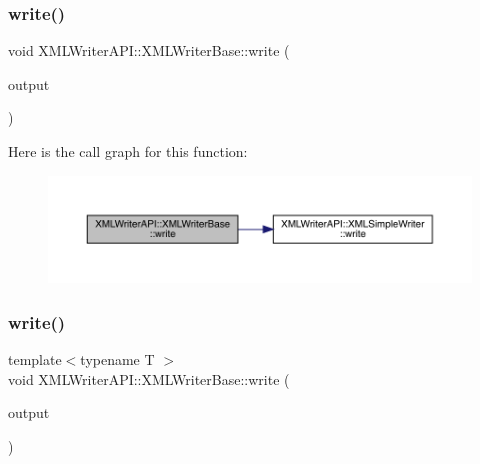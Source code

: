 \subsubsection{\texorpdfstring{write()}{write()}\hspace{0.1cm}{\footnotesize\ttfamily [20/26]}}
{\footnotesize\ttfamily void X\+M\+L\+Writer\+A\+P\+I\+::\+X\+M\+L\+Writer\+Base\+::write (\begin{DoxyParamCaption}\item[{const bool \&}]{output }\end{DoxyParamCaption})\hspace{0.3cm}{\ttfamily [inline]}}

Here is the call graph for this function\+:
\nopagebreak
\begin{figure}[H]
\begin{center}
\leavevmode
\includegraphics[width=350pt]{d5/df5/classXMLWriterAPI_1_1XMLWriterBase_ac9c7d2ed0127b4dd05b4b3c0225d9f34_cgraph}
\end{center}
\end{figure}
\mbox{\label{classXMLWriterAPI_1_1XMLWriterBase_a00b5edcaf39f8bdaf2aa5eed7118c8e7}} 
\subsubsection{\texorpdfstring{write()}{write()}\hspace{0.1cm}{\footnotesize\ttfamily [21/26]}}
{\footnotesize\ttfamily template$<$typename T $>$ \\
void X\+M\+L\+Writer\+A\+P\+I\+::\+X\+M\+L\+Writer\+Base\+::write (\begin{DoxyParamCaption}\item[{\mbox{\hyperlink{classXMLTComplex_1_1TComplex}{T\+Complex}}$<$ T $>$ \&}]{output }\end{DoxyParamCaption})\hspace{0.3cm}{\ttfamily [inline]}}

